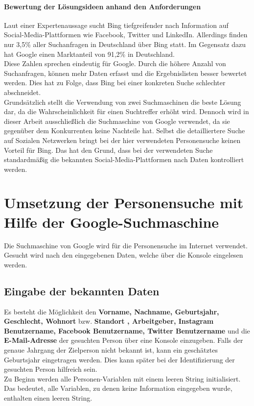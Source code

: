 				\paragraph{Bewertung der Lösungsideen anhand den Anforderungen}
				Laut einer Expertenaussage sucht Bing tiefgreifender nach Information auf Social-Media-Plattformen wie Facebook, Twitter und LinkedIn. \cite{Suchmaschinen} Allerdings finden nur 3,5\% aller Suchanfragen in Deutschland über Bing statt. Im Gegensatz dazu hat Google einen Marktanteil von 91,2\% in Deutschland. \cite{Suchmaschinen}\\
				Diese Zahlen sprechen eindeutig für Google. Durch die höhere Anzahl von Suchanfragen, können mehr Daten erfasst und die Ergebnislisten besser bewertet werden. Dies hat zu Folge, dass Bing bei einer konkreten Suche schlechter abschneidet. \\
				Grundsätzlich stellt die Verwendung von zwei Suchmaschinen die beste Lösung dar, da die Wahrscheinlichkeit für einen Suchtreffer erhöht wird. Dennoch wird in dieser Arbeit ausschließlich die Suchmaschine von Google verwendet, da sie gegenüber dem Konkurrenten keine Nachteile hat. Selbst die detailliertere Suche auf Sozialen Netzwerken bringt bei der hier verwendeten Personensuche keinen Vorteil für Bing. Das hat den Grund, dass bei der verwendeten Suche standardmäßig die bekannten Social-Media-Plattformen nach Daten kontrolliert werden. 
		 	
\section{Umsetzung der Personensuche mit Hilfe der Google-Suchmaschine}
Die Suchmaschine von Google wird für die Personensuche im Internet verwendet. Gesucht wird nach den eingegebenen Daten, welche über die Konsole eingelesen werden.

	\subsection{Eingabe der bekannten Daten}
	Es besteht die Möglichkeit den \textbf{Vorname, Nachname, Geburtsjahr, Geschlecht, Wohnort} bzw. \textbf{Standort , Arbeitgeber, Instagram Benutzername, Facebook Benutzername, Twitter Benutzername} und die \textbf{E-Mail-Adresse} der gesuchten Person über eine Konsole einzugeben. Falls der genaue Jahrgang der Zielperson nicht bekannt ist, kann ein geschätztes Geburtsjahr eingetragen werden. Dies kann später bei der Identifizierung der gesuchten Person hilfreich sein.\\
	Zu Beginn werden alle Personen-Variablen mit einem leeren String initialisiert. Das bedeutet, alle Variablen, zu denen keine Information eingegeben wurde, enthalten einen leeren String.
	
